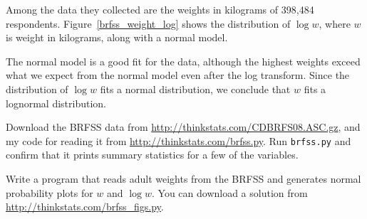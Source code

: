 \documentclass[12pt]{book}
\begin{document}
Among the data they collected are the weights in kilograms of
398,484 respondents.
Figure~\ref{brfss_weight_log} shows the distribution
of $\log w$, where $w$ is weight in kilograms, along with a normal
model.

The normal model is a good fit for the data, although the highest
weights exceed what we expect from the normal model even after the log
transform.  Since the distribution of $\log w$ fits a normal distribution, we
conclude that $w$ fits a lognormal distribution.



\begin{exercise}
Download the BRFSS data from 
\url{http://thinkstats.com/CDBRFS08.ASC.gz}, and my code for reading it
from
\url{http://thinkstats.com/brfss.py}.  Run {\tt brfss.py} and confirm that
it prints summary statistics for a few of the variables.

Write a program that reads adult weights from the BRFSS and
generates normal probability plots for $w$ and $\log w$.  You can
download a solution from \url{http://thinkstats.com/brfss_figs.py}.

\end{exercise}
\end{document}

